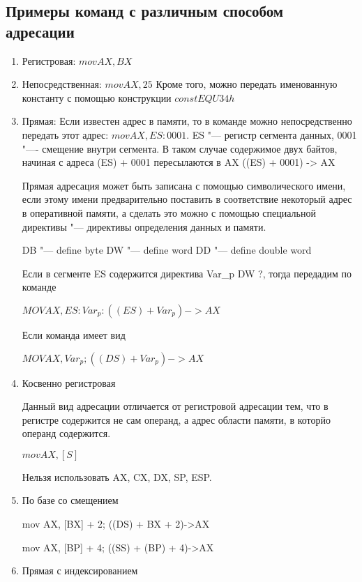 \subsection{Примеры команд с различным способом адресации}

\begin{enumerate}
    \item Регистровая:
    $mov AX, BX$
    \item Непосредственная:
    $mov AX, 25$
    Кроме того, можно передать именованную константу с помощью конструкции $const EQU 34h$
    \item Прямая:
    Если известен адрес в памяти, то в команде можно непосредственно передать этот адрес:
    $mov AX, ES : 0001$.
    ES "--- регистр сегмента данных, 0001 "---- смещение внутри сегмента. В таком случае
    содержимое двух байтов, начиная с адреса (ES) + 0001 пересылаются в AX
    ((ES) + 0001) -> AX

    Прямая адресация может быть записана с помощью символического имени, если этому имени
    предварительно поставить в соответствие некоторый адрес в оперативной памяти, а сделать
    это можно с помощью специальной директивы "--- директивы определения данных и памяти.
    
    DB "--- define byte
    DW "--- define word
    DD "--- define double word
    
    Если в сегменте ES содержится директива Var_p DW ?, тогда передадим по команде

    $MOV AX, ES: Var_p : ((ES) + Var_p) -> AX$
    
    Если команда имеет вид
    
    $MOV AX, Var_p; ((DS) + Var_p) -> AX$
    \item Косвенно регистровая
    
    Данный вид адресации отличается от регистровой адресации тем, что в регистре содержится
    не сам операнд, а адрес области памяти, в которйо операнд содержится.
    
    $mov AX,[S]$
    
    Нельзя использовать AX, CX, DX, SP, ESP.
    
    \item По базе со смещением
    
    mov AX, [BX] + 2; ((DS) + BX + 2)->AX
    
    mov AX, [BP] + 4; ((SS) + (BP) + 4)->AX
    
    \item Прямая с индексированием
    

\end{enumerate}
